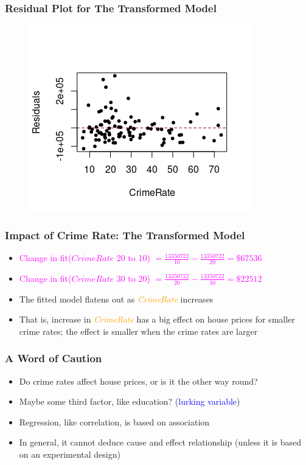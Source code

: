 \documentclass[10pt]{beamer}
\theoremstyle{plain}
\begin{document}
\begin{frame}
\frametitle{\sc Residual Plot for The Transformed Model}
    \begin{figure}[!ht]
		\centering
		\includegraphics[scale=0.9]{figs8/residuals-recip.png}
	\end{figure}
\end{frame}

\begin{frame}
\frametitle{\sc Impact of Crime Rate: The Transformed Model}
	\begin{itemize}
	\item \textcolor{magenta}{Change in fit($CrimeRate$ 20 to 10) $= \frac{13350722}{10} - \frac{13350722}{20} = \$67536$}
	\item \textcolor{magenta}{Change in fit($CrimeRate$ 30 to 20) $= \frac{13350722}{20} - \frac{13350722}{30} = \$22512$}
	\item The fitted model flatens out as \textcolor{orange}{\textit{CrimeRate}} increases
	\item That is, increase in \textcolor{orange}{\textit{CrimeRate}} has a big effect on house prices for smaller crime rates; the effect is smaller when the crime rates are larger
	\end{itemize}
\end{frame}

\begin{frame}
\frametitle{A Word of Caution}
	\begin{itemize}
	\item Do crime rates affect house prices, or is it the other way round? 
	\item Maybe some third factor, like education? (\textcolor{blue}{lurking variable})
	\item Regression, like correlation, is based on association
	\item In general, it cannot deduce cause and effect relationship (unless it is based on an experimental design)
	\end{itemize}
\end{frame}
\end{document}
